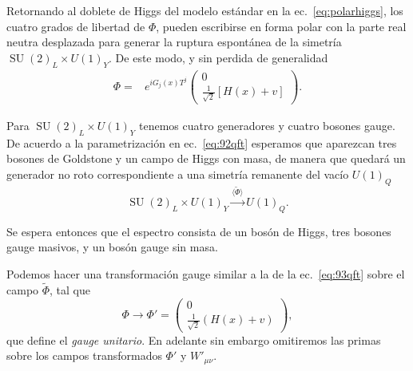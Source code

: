 \begin{frame}
Retornando al doblete de Higgs del modelo estándar en la ec.~\eqref{eq:polarhiggs}, los cuatro grados de libertad de $\Phi$, pueden escribirse en forma polar con la parte real neutra desplazada para generar la ruptura espontánea de la simetría $\operatorname{SU}(2)_L\times  U(1)_Y$. De este modo, y sin perdida de generalidad
\begin{align}
\label{eq:92qft}
  {\Phi}=&e^{i G_j(x)T^j}
  \begin{pmatrix}
    0\\
    \frac{1}{\sqrt{2}}[H(x)+v]
  \end{pmatrix}.
\end{align}

Para $\operatorname{SU}(2)_L\times  U(1)_Y$ tenemos cuatro generadores y cuatro bosones gauge. De acuerdo a la parametrización en ec.~\eqref{eq:92qft} esperamos que aparezcan tres bosones de Goldstone y un campo de Higgs con masa, de manera que quedará un generador no roto correspondiente a una simetría remanente del vacío $U(1)_Q$
\begin{equation}
  \operatorname{SU}(2)_L\times  U(1)_Y\overset{\langle\widetilde{\Phi}\rangle}{\longrightarrow}U(1)_Q.
\end{equation}

Se espera entonces que el espectro consista de un bosón de Higgs, tres bosones gauge masivos, y un bosón gauge sin masa.

Podemos hacer una transformación gauge similar a la de la 
ec.~\eqref{eq:93qft} sobre el campo $\widetilde{\Phi}$, tal que
\begin{equation}
  \label{eq:123qft}
    {\Phi}\to{\Phi}'=
  \begin{pmatrix}
    0\\
    \frac{1}{\sqrt{2}}(H(x)+v)
  \end{pmatrix},
\end{equation}
que define el \emph{gauge unitario}. En adelante sin embargo omitiremos las primas sobre los campos transformados ${\Phi}'$ y $W'_{\mu\nu}$.


\end{frame}
